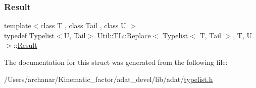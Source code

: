 \mbox{\label{structUtil_1_1TL_1_1Replace_3_01Typelist_3_01T_00_01Tail_01_4_00_01T_00_01U_01_4_a673e2d2a7c26a530c7015a04bde5a506}} 
\subsubsection{\texorpdfstring{Result}{Result}\hspace{0.1cm}{\footnotesize\ttfamily [2/2]}}
{\footnotesize\ttfamily template$<$class T , class Tail , class U $>$ \\
typedef \mbox{\hyperlink{structUtil_1_1Typelist}{Typelist}}$<$U, Tail$>$ \mbox{\hyperlink{structUtil_1_1TL_1_1Replace}{Util\+::\+T\+L\+::\+Replace}}$<$ \mbox{\hyperlink{structUtil_1_1Typelist}{Typelist}}$<$ T, Tail $>$, T, U $>$\+::\mbox{\hyperlink{structUtil_1_1TL_1_1Replace_3_01Typelist_3_01T_00_01Tail_01_4_00_01T_00_01U_01_4_a673e2d2a7c26a530c7015a04bde5a506}{Result}}}



The documentation for this struct was generated from the following file\+:\begin{DoxyCompactItemize}
\item 
/\+Users/archanar/\+Kinematic\+\_\+factor/adat\+\_\+devel/lib/adat/\mbox{\hyperlink{lib_2adat_2typelist_8h}{typelist.\+h}}\end{DoxyCompactItemize}
